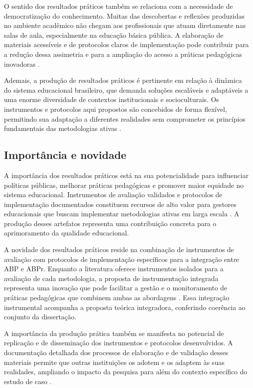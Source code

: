 O sentido dos resultados práticos também se relaciona com a necessidade de democratização do conhecimento. Muitas das descobertas e reflexões produzidas no ambiente acadêmico não chegam aos profissionais que atuam diretamente nas salas de aula, especialmente na educação básica pública. A elaboração de materiais acessíveis e de protocolos claros de implementação pode contribuir para a redução dessa assimetria e para a ampliação do acesso a práticas pedagógicas inovadoras \cite{MACHADO2025}.

Ademais, a produção de resultados práticos é pertinente em relação à dinâmica do sistema educacional brasileiro, que demanda soluções escaláveis e adaptáveis a uma enorme diversidade de contextos institucionais e socioculturais. Os instrumentos e protocolos aqui propostos são concebidos de forma flexível, permitindo sua adaptação a diferentes realidades sem comprometer os princípios fundamentais das metodologias ativas \cite{COSTA2020}.

\subsection{Importância e novidade}
\label{subsec:jpr_importancia}

A importância dos resultados práticos está na sua potencialidade para influenciar políticas públicas, melhorar práticas pedagógicas e promover maior equidade no sistema educacional. Instrumentos de avaliação validados e protocolos de implementação documentados constituem recursos de alto valor para gestores educacionais que buscam implementar metodologias ativas em larga escala \cite{BRASIL2018}. A produção desses artefatos representa uma contribuição concreta para o aprimoramento da qualidade educacional.

A novidade dos resultados práticos reside na combinação de instrumentos de avaliação com protocolos de implementação específicos para a integração entre ABP e ABPr. Enquanto a literatura oferece instrumentos isolados para a avaliação de cada metodologia, a proposta de instrumentação integrada representa uma inovação que pode facilitar a gestão e o monitoramento de práticas pedagógicas que combinem ambas as abordagens \cite{TEODORO2024}. Essa integração instrumental acompanha a proposta teórica integradora, conferindo coerência ao conjunto da dissertação.

A importância da produção prática também se manifesta no potencial de replicação e de disseminação dos instrumentos e protocolos desenvolvidos. A documentação detalhada dos processos de elaboração e de validação desses materiais permite que outras instituições os adotem e os adaptem às suas realidades, ampliando o impacto da pesquisa para além do contexto específico do estudo de caso \cite{BARRON1998}.

